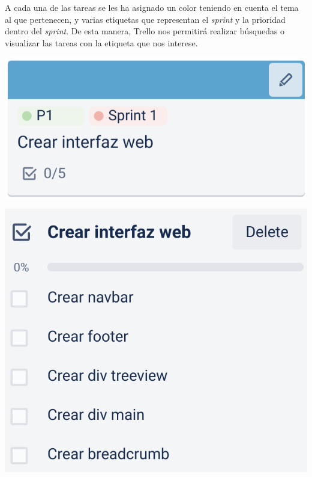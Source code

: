 \documentclass{\ClassPath/viu-tfm-template}
\begin{document}


A cada una de las tareas se les ha asignado un color teniendo en cuenta el tema al que pertenecen, y varias etiquetas que representan el \textit{sprint} y la prioridad dentro del \textit{sprint}. De esta manera, Trello nos permitirá realizar búsquedas o visualizar las tareas con la etiqueta que nos interese.


\begin{minipage}{0.48\linewidth}
    \includegraphics[width=\linewidth]{img/tarea.png}
\end{minipage}
\hfill
\begin{minipage}{0.40\linewidth}
    \includegraphics[width=\linewidth]{img/tarea1.png}
\end{minipage}
\end{document}
